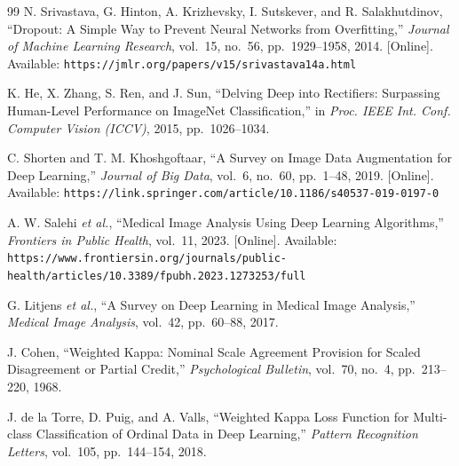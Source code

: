 \begin{thebibliography}{99}
N. Srivastava, G. Hinton, A. Krizhevsky, I. Sutskever, and R. Salakhutdinov,
``Dropout: A Simple Way to Prevent Neural Networks from Overfitting,''
\textit{Journal of Machine Learning Research}, vol.~15, no.~56, pp.~1929--1958, 2014.
[Online]. Available: \texttt{https://jmlr.org/papers/v15/srivastava14a.html}

K. He, X. Zhang, S. Ren, and J. Sun,
``Delving Deep into Rectifiers: Surpassing Human-Level Performance on ImageNet Classification,''
in \textit{Proc. IEEE Int. Conf. Computer Vision (ICCV)}, 2015, pp.~1026--1034.

C. Shorten and T. M. Khoshgoftaar,
``A Survey on Image Data Augmentation for Deep Learning,''
\textit{Journal of Big Data}, vol.~6, no.~60, pp.~1--48, 2019.
[Online]. Available: \texttt{https://link.springer.com/article/10.1186/s40537-019-0197-0}

A. W. Salehi \textit{et al.},
``Medical Image Analysis Using Deep Learning Algorithms,''
\textit{Frontiers in Public Health}, vol.~11, 2023.
[Online]. Available: \texttt{https://www.frontiersin.org/journals/public-health/articles/10.3389/fpubh.2023.1273253/full}

G. Litjens \textit{et al.},
``A Survey on Deep Learning in Medical Image Analysis,''
\textit{Medical Image Analysis}, vol.~42, pp.~60--88, 2017.

J. Cohen,
``Weighted Kappa: Nominal Scale Agreement Provision for Scaled Disagreement or Partial Credit,''
\textit{Psychological Bulletin}, vol.~70, no.~4, pp.~213--220, 1968.

J. de la Torre, D. Puig, and A. Valls,
``Weighted Kappa Loss Function for Multi-class Classification of Ordinal Data in Deep Learning,''
\textit{Pattern Recognition Letters}, vol.~105, pp.~144--154, 2018.

\end{thebibliography}
